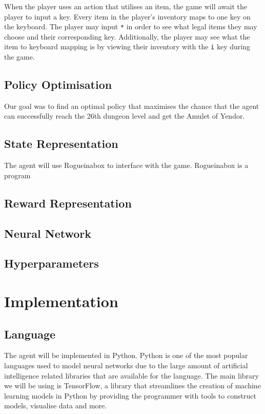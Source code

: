 \documentclass[11pt,a4paper]{article}
\begin{document}
When the player uses an action that utilises an item, the game will await the player to input a key. Every item in the player's inventory maps to one key on the keyboard. The player may input \texttt{*} in order to see what legal items they may choose and their corresponding key. Additionally, the player may see what the item to keyboard mapping is by viewing their inventory with the \texttt{i} key during the game.

\subsection{Policy Optimisation}
Our goal was to find an optimal policy that maximises the chance that the agent can successfully reach the 26th dungeon level and get the Amulet of Yendor.
\subsection{State Representation}
The agent will use Rogueinabox to interface with the game. Rogueinabox is a program
\subsection{Reward Representation}
\subsection{Neural Network}

\subsection{Hyperparameters}




\section{Implementation}
\subsection{Language}
The agent will be implemented in Python. Python is one of the most popular languages used to model neural networks due to the large amount of artificial intelligence related libraries that are available for the language. The main library we will be using is TensorFlow, a library that streamlines the creation of machine learning models in Python by providing the programmer with tools to construct models, visualise data and more.
\end{document}
